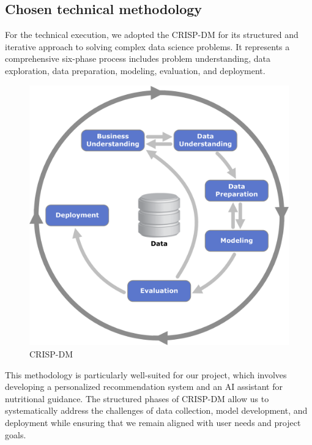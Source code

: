 \subsection{Chosen technical methodology}

For the technical execution, we adopted the CRISP-DM for its structured
and iterative approach to solving complex data science problems. It
represents a comprehensive six-phase process includes problem understanding, data exploration, data preparation, modeling, evaluation, and
deployment.
\begin{center}
\begin{figure}[H]
            \centering
            \includegraphics[scale=0.44]{images/CRISP.png}
            \caption{CRISP-DM} 
            \label{fig:CRIS-DM}
        \end{figure}
\end{center}

This methodology is particularly well-suited for our project, which involves
developing a personalized recommendation system and an AI assistant
for nutritional guidance. The structured phases of CRISP-DM allow
us to systematically address the challenges of data collection, model development, and deployment while ensuring that we remain aligned
with user needs and project goals.



